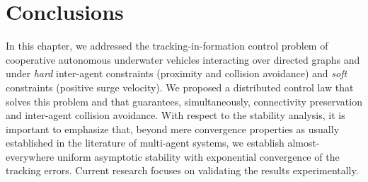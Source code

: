 
\section{Conclusions}\label{sec:conclusions}

In this chapter, we addressed the tracking-in-formation control problem of cooperative autonomous underwater vehicles interacting over directed graphs and under \emph{hard} inter-agent constraints (proximity and collision avoidance) and \emph{soft} constraints (positive surge velocity). 
We proposed a distributed control law that solves this problem and that guarantees, simultaneously, connectivity preservation and inter-agent collision avoidance.
With respect to the stability analysis, it is important to emphasize that, beyond mere convergence properties as usually established in the literature of multi-agent systems, we establish almost-everywhere uniform asymptotic stability with exponential convergence of the tracking errors. 
Current research focuses on validating the results experimentally.
